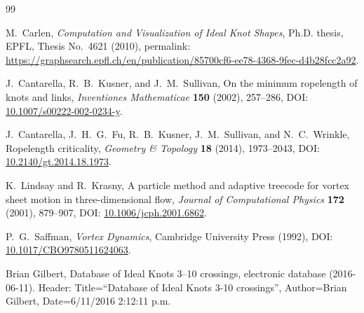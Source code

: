 \begin{thebibliography}{99}

M.~Carlen,
\newblock \emph{Computation and Visualization of Ideal Knot Shapes},
\newblock Ph.D. thesis, EPFL, Thesis No.~4621 (2010),
\newblock permalink: \url{https://graphsearch.epfl.ch/en/publication/85700cf6-ee78-4368-9fec-d4b28fcc2a92}.

J.~Cantarella, R.~B.~Kusner, and J.~M.~Sullivan,
\newblock On the minimum ropelength of knots and links,
\newblock \emph{Inventiones Mathematicae} \textbf{150} (2002), 257--286,
\newblock DOI: \href{https://doi.org/10.1007/s00222-002-0234-y}{10.1007/s00222-002-0234-y}.

J.~Cantarella, J.~H.~G.~Fu, R.~B.~Kusner, J.~M.~Sullivan, and N.~C.~Wrinkle,
\newblock Ropelength criticality,
\newblock \emph{Geometry \& Topology} \textbf{18} (2014), 1973--2043,
\newblock DOI: \href{https://doi.org/10.2140/gt.2014.18.1973}{10.2140/gt.2014.18.1973}.

K.~Lindsay and R.~Krasny,
\newblock A particle method and adaptive treecode for vortex sheet motion in three-dimensional flow,
\newblock \emph{Journal of Computational Physics} \textbf{172} (2001), 879--907,
\newblock DOI: \href{https://doi.org/10.1006/jcph.2001.6862}{10.1006/jcph.2001.6862}.

P.~G.~Saffman,
\newblock \emph{Vortex Dynamics},
\newblock Cambridge University Press (1992),
\newblock DOI: \href{https://doi.org/10.1017/CBO9780511624063}{10.1017/CBO9780511624063}.

Brian Gilbert,
\newblock Database of Ideal Knots 3--10 crossings,
\newblock electronic database (2016-06-11).
\newblock Header: Title=``Database of Ideal Knots 3-10 crossings'',
Author=Brian Gilbert, Date=6/11/2016 2:12:11 p.m.

\end{thebibliography}
